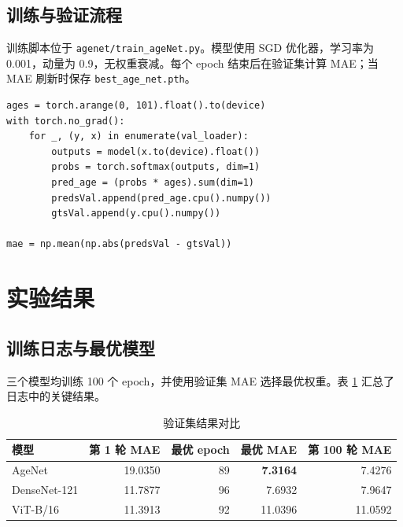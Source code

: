 \documentclass[12pt,a4paper,fontset=fandol]{ctexart}
\begin{document}
\subsection{训练与验证流程}

训练脚本位于 \texttt{agenet/train\_ageNet.py}。模型使用 SGD 优化器，学习率为 0.001，动量为 0.9，无权重衰减。每个 epoch 结束后在验证集计算 MAE；当 MAE 刷新时保存 \texttt{best\_age\_net.pth}。

\begin{lstlisting}[caption={验证阶段的概率期望与 MAE 计算}]
ages = torch.arange(0, 101).float().to(device)
with torch.no_grad():
    for _, (y, x) in enumerate(val_loader):
        outputs = model(x.to(device).float())
        probs = torch.softmax(outputs, dim=1)
        pred_age = (probs * ages).sum(dim=1)
        predsVal.append(pred_age.cpu().numpy())
        gtsVal.append(y.cpu().numpy())

mae = np.mean(np.abs(predsVal - gtsVal))
\end{lstlisting}

\section{实验结果}

\subsection{训练日志与最优模型}

三个模型均训练 100 个 epoch，并使用验证集 MAE 选择最优权重。表 \ref{tab:result} 汇总了日志中的关键结果。

\begin{table}[H]
  \centering
  \caption{验证集结果对比}
  \label{tab:result}
  \begin{tabular}{lrrrr}
    \toprule
    模型 & 第 1 轮 MAE & 最优 epoch & 最优 MAE & 第 100 轮 MAE \\
    \midrule
    AgeNet & 19.0350 & 89 & \textbf{7.3164} & 7.4276 \\
    DenseNet-121 & 11.7877 & 96 & 7.6932 & 7.9647 \\
    ViT-B/16 & 11.3913 & 92 & 11.0396 & 11.0592 \\
    \bottomrule
  \end{tabular}
\end{table}
\end{document}
